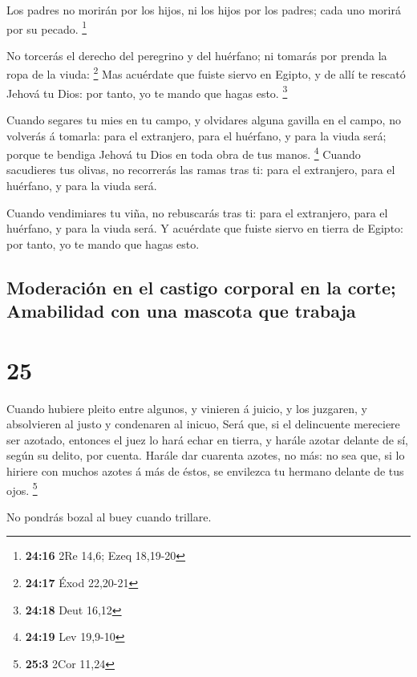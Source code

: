  Los padres no morirán por los hijos, ni los hijos por
los padres; cada uno morirá por su pecado. \footnote{\textbf{24:16} 2Re
  14,6; Ezeq 18,19-20}

 No torcerás el derecho del peregrino y del huérfano; ni
tomarás por prenda la ropa de la viuda: \footnote{\textbf{24:17} Éxod
  22,20-21}  Mas acuérdate que fuiste siervo en Egipto, y
de allí te rescató Jehová tu Dios: por tanto, yo te mando que hagas
esto. \footnote{\textbf{24:18} Deut 16,12}

 Cuando segares tu mies en tu campo, y olvidares alguna
gavilla en el campo, no volverás á tomarla: para el extranjero, para el
huérfano, y para la viuda será; porque te bendiga Jehová tu Dios en toda
obra de tus manos. \footnote{\textbf{24:19} Lev 19,9-10} 
Cuando sacudieres tus olivas, no recorrerás las ramas tras ti: para el
extranjero, para el huérfano, y para la viuda será.

 Cuando vendimiares tu viña, no rebuscarás tras ti: para
el extranjero, para el huérfano, y para la viuda será.  Y
acuérdate que fuiste siervo en tierra de Egipto: por tanto, yo te mando
que hagas esto.

\hypertarget{moderaciuxf3n-en-el-castigo-corporal-en-la-corte-amabilidad-con-una-mascota-que-trabaja}{%
\subsection{Moderación en el castigo corporal en la corte; Amabilidad
con una mascota que
trabaja}\label{moderaciuxf3n-en-el-castigo-corporal-en-la-corte-amabilidad-con-una-mascota-que-trabaja}}

\hypertarget{section-24}{%
\section{25}\label{section-24}}

 Cuando hubiere pleito entre algunos, y vinieren á juicio,
y los juzgaren, y absolvieren al justo y condenaren al inicuo,
 Será que, si el delincuente mereciere ser azotado,
entonces el juez lo hará echar en tierra, y harále azotar delante de sí,
según su delito, por cuenta.  Harále dar cuarenta azotes,
no más: no sea que, si lo hiriere con muchos azotes á más de éstos, se
envilezca tu hermano delante de tus ojos. \footnote{\textbf{25:3} 2Cor
  11,24}

 No pondrás bozal al buey cuando trillare.

